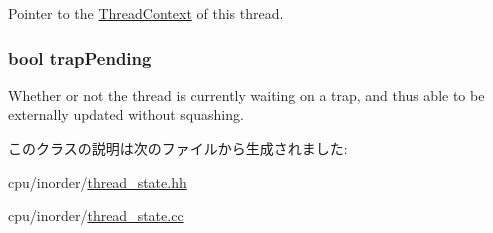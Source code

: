 \label{classInOrderThreadState_a4455a4759e69e5ebe68ae7298cbcc37d}
Pointer to the \hyperlink{classThreadContext}{ThreadContext} of this thread. \hypertarget{classInOrderThreadState_aa9f948437524f88e51afd737df505200}{
\subsubsection[{trapPending}]{\setlength{\rightskip}{0pt plus 5cm}bool {\bf trapPending}}}
\label{classInOrderThreadState_aa9f948437524f88e51afd737df505200}
Whether or not the thread is currently waiting on a trap, and thus able to be externally updated without squashing. 

このクラスの説明は次のファイルから生成されました:\begin{DoxyCompactItemize}
\item 
cpu/inorder/\hyperlink{inorder_2thread__state_8hh}{thread\_\-state.hh}\item 
cpu/inorder/\hyperlink{inorder_2thread__state_8cc}{thread\_\-state.cc}\end{DoxyCompactItemize}
